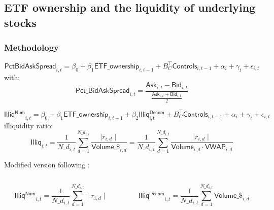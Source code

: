 \documentclass[handout, 9pt, usenames, dvipsnames]{beamer}
\begin{document}
\subsection{ETF ownership and the liquidity of underlying stocks}
\begin{frame}
  \frametitle{Methodology}
  \begin{equation}
 \mathsf{PctBidAskSpread}_{i,t} = \beta_{0} + \beta_{1} \mathsf{ETF\_ownership}_{i, t - 1} + B_{C}^{\intercal} \mathsf{Controls}_{i, t - 1} + \alpha_{i} + \gamma_{t} + \epsilon_{i, t}
  \end{equation}
  with:
  \begin{equation*}
  \mathsf{Pct\_BidAskSpread}_{i, t} = \frac{\mathsf{Ask}_{i, t} - \mathsf{Bid}_{i, t}}{\frac{\mathsf{Ask}_{i, t} + \mathsf{Bid}_{i, t}}{2}}
\end{equation*}

  \begin{equation}
   \mathsf{Illiq^{Num}}_{i,t} = \beta_{0} + \beta_{1} \mathsf{ETF\_ownership}_{i, t - 1} + \beta_{2} \mathsf{Illiq^{Denom}_{i,t}} + B_{C}^{\intercal} \mathsf{Controls}_{i, t- 1} + \alpha_{i} + \gamma_{t} + \epsilon_{i, t}
\end{equation}
  \textcite{Amihud2002} illiquidity ratio:
  \begin{equation*}
    \mathsf{Illiq}_{i, t}  = \frac{1}{N\_d_{i, t}} \sum_{d = 1}^{N\_d_{i, t}} \frac{\mid r_{i, d} \mid}{\mathsf{Volume\_\$}_{i, d}} = \frac{1}{N\_d_{i, t}} \sum_{d = 1}^{N\_d_{i, t}} \frac{\mid r_{i, d} \mid}{\mathsf{Volume}_{i, d} \cdot \mathsf{VWAP}_{i, d}}
  \end{equation*}

  Modified version following \textcite{Israeli2017}:
  \begin{columns}
    \begin{column}{0.5\textwidth}
      \begin{equation*}
        \mathsf{Illiq^{Num}}_{i, t} = \frac{1}{N\_d_{i, t}} \sum_{d = 1}^{N\_d_{i, t}}\mid r_{i, d} \mid
        \end{equation*}
    \end{column}
    \begin{column}{0.5\textwidth}
      \begin{equation*}
        \mathsf{Illiq^{Denom}}_{i, t} = \frac{1}{N\_d_{i, t}} \sum_{d = 1}^{N\_d_{i, t}} \mathsf{Volume\_\$}_{i, d}
        \end{equation*}
    \end{column}
  \end{columns}

\end{frame}
\end{document}
